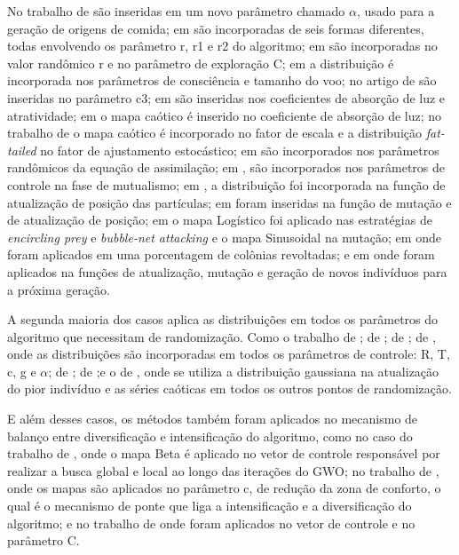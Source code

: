 No trabalho de \cite{mitic} são inseridas em um novo parâmetro chamado $\alpha$, usado para a geração de origens de comida; em \cite{bingol} são incorporadas de seis formas diferentes, todas envolvendo os parâmetro r, r1 e r2 do algoritmo; em \cite{mitic2} são incorporadas no valor randômico r e no parâmetro de exploração C; em \cite{coelho4} a distribuição é incorporada nos parâmetros de consciência e tamanho do voo; no artigo de \cite{ahmed} são inseridas no parâmetro c3; em \cite{gandomi2} são inseridas nos coeficientes de absorção de luz e atratividade; em \cite{coelho3} o mapa caótico é inserido no coeficiente de absorção de luz; no trabalho de \cite{wood} o mapa caótico é incorporado no fator de escala e a distribuição \textit{fat-tailed} no fator de ajustamento estocástico; em \cite{talahari} são incorporados nos parâmetros randômicos da equação de assimilação; em \cite{ayala}, são incorporados nos parâmetros de controle na fase de mutualismo; em \cite{ismail}, a distribuição foi incorporada na função de atualização de posição das partículas; em \cite{saeed2} foram inseridas na função de mutação e de atualização de posição; em \cite{ding} o mapa Logístico foi aplicado nas estratégias de \textit{encircling prey} e \textit{bubble-net attacking} e o mapa Sinusoidal na mutação; em \cite{mortazavi} onde foram aplicados em uma porcentagem de colônias revoltadas; e em \cite{saeed} onde foram aplicados na funções de atualização, mutação e geração de novos indivíduos para a próxima geração.

A segunda maioria dos casos aplica as distribuições em todos os parâmetros do algoritmo que necessitam de randomização. Como o trabalho de \cite{gandomi}; de \cite{sayed}; de \cite{turgut}; de \cite{ayala2}, onde as distribuições são incorporadas em todos os parâmetros de controle: R, T, c, g e $\alpha$; de \cite{senserik2}; de \cite{jaddi};e o de \cite{feng}, onde se utiliza a distribuição gaussiana na atualização do pior indivíduo e as séries caóticas em todos os outros pontos de randomização.

E além desses casos, os métodos também foram aplicados no mecanismo de balanço entre diversificação e intensificação do algoritmo, como no caso do trabalho de \cite{saxena}, onde o mapa Beta é aplicado no vetor de controle responsável por realizar a busca global e local ao longo das iterações do GWO; no trabalho de \cite{saxena2}, onde os mapas são aplicados no parâmetro c, de redução da zona de conforto, o qual é o mecanismo de ponte que liga a intensificação e a diversificação do algoritmo; e no trabalho de \cite{oliveira} onde foram aplicados no vetor de controle e no parâmetro C.

